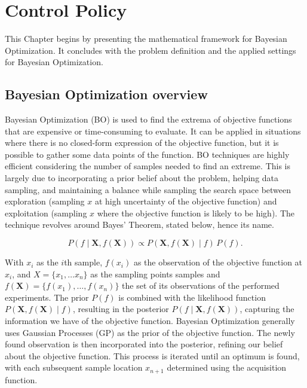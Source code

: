 \chapter{Control Policy}
\label{chapter:ControlPolicy}
This Chapter begins by presenting the mathematical framework for Bayesian Optimization. It concludes with the problem definition and the applied settings for Bayesian Optimization. 

\section{Bayesian Optimization overview}
Bayesian Optimization (BO) is used to find the extrema of objective functions that are expensive or time-consuming to evaluate. It can be applied in situations where there is no closed-form expression of the objective function, but it is possible to gather some data points of the function. BO techniques are highly efficient considering the number of samples needed to find an extreme. This is 
largely due to incorporating a prior belief about the problem, helping data sampling, and maintaining a balance while sampling the search space between exploration (sampling $x$ at high uncertainty of the objective function) and exploitation (sampling $x$ where the objective function is likely to be high). The technique revolves around Bayes' Theorem, stated below, hence its name.

\begin{equation}
    P(f \mid \boldsymbol{X},f(\boldsymbol{X})) \propto P(\boldsymbol{X},f(\boldsymbol{X})\mid f)\, P(f).
\end{equation}

\noindent With $x_i$ as the $i$th sample, $f(x_i)$ as the observation of the 
objective function at $x_i$, and $X = \{x_1, \ldots x_n\}$ as the sampling points samples and $f(\boldsymbol{X}) = \{f(x_1), \ldots, f(x_n)\}$ the set of its observations of the performed experiments. The prior $P(f)$ is combined with the likelihood function $P(\boldsymbol{X},f(\boldsymbol{X})\mid f)$, resulting in the posterior 
$P(f \mid\boldsymbol{X},f(\boldsymbol{X}))$, capturing the information we have of the objective function. Bayesian Optimization generally uses Gaussian Processes (GP) as the prior of the objective function. The newly found observation is then incorporated into the posterior, refining our belief about the objective function. This process is iterated until an optimum is found, with each subsequent sample location $x_{n+1}$ determined using the acquisition function. 

